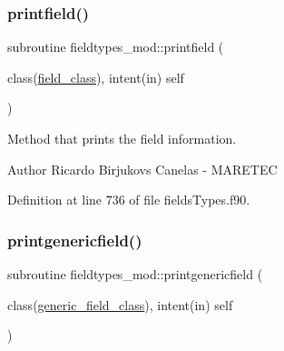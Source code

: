 \subsubsection{\texorpdfstring{printfield()}{printfield()}}
{\footnotesize\ttfamily subroutine fieldtypes\+\_\+mod\+::printfield (\begin{DoxyParamCaption}\item[{class(\mbox{\hyperlink{structfieldtypes__mod_1_1field__class}{field\+\_\+class}}), intent(in)}]{self }\end{DoxyParamCaption})\hspace{0.3cm}{\ttfamily [private]}}



Method that prints the field information. 

\begin{DoxyAuthor}{Author}
Ricardo Birjukovs Canelas -\/ M\+A\+R\+E\+T\+EC 
\end{DoxyAuthor}


Definition at line 736 of file fields\+Types.\+f90.


\mbox{\label{namespacefieldtypes__mod_a63d399d72fffde3fe8169b76cce59259}} 
\subsubsection{\texorpdfstring{printgenericfield()}{printgenericfield()}}
{\footnotesize\ttfamily subroutine fieldtypes\+\_\+mod\+::printgenericfield (\begin{DoxyParamCaption}\item[{class(\mbox{\hyperlink{structfieldtypes__mod_1_1generic__field__class}{generic\+\_\+field\+\_\+class}}), intent(in)}]{self }\end{DoxyParamCaption})\hspace{0.3cm}{\ttfamily [private]}}



